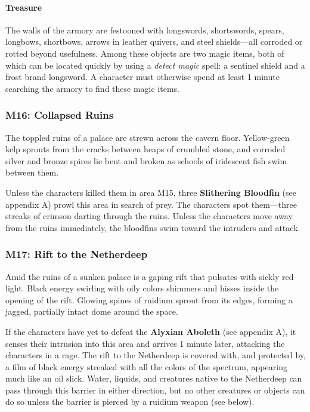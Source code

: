 \documentclass[10pt,a4,twoside,twocolumn,openany,nodeprecatedcode]{dndbook}
\begin{document}
\paragraph{Treasure}
The walls of the armory are festooned with longswords, shortswords, spears, longbows, shortbows, arrows in leather quivers, and steel shields—all corroded or rotted beyond usefulness. Among these objects are two magic items, both of which can be located quickly by using a \textit{detect magic} spell: a sentinel shield and a frost brand longsword. A character must otherwise spend at least 1 minute searching the armory to find these magic items.
\subsubsection{M16: Collapsed Ruins}
\begin{DndReadAloud}{}
The toppled ruins of a palace are strewn across the cavern floor. Yellow-green kelp sprouts from the cracks between heaps of crumbled stone, and corroded silver and bronze spires lie bent and broken as schools of iridescent fish swim between them.
\end{DndReadAloud}

Unless the characters killed them in area M15, three \textbf{Slithering Bloodfin} (see appendix A) prowl this area in search of prey. The characters spot them—three streaks of crimson darting through the ruins. Unless the characters move away from the ruins immediately, the bloodfins swim toward the intruders and attack.
\subsubsection{M17: Rift to the Netherdeep}
\begin{DndReadAloud}{}
Amid the ruins of a sunken palace is a gaping rift that pulsates with sickly red light. Black energy swirling with oily colors shimmers and hisses inside the opening of the rift. Glowing spines of ruidium sprout from its edges, forming a jagged, partially intact dome around the space.
\end{DndReadAloud}

If the characters have yet to defeat the \textbf{Alyxian Aboleth} (see appendix A), it senses their intrusion into this area and arrives 1 minute later, attacking the characters in a rage.
The rift to the Netherdeep is covered with, and protected by, a film of black energy streaked with all the colors of the spectrum, appearing much like an oil slick. Water, liquids, and creatures native to the Netherdeep can pass through this barrier in either direction, but no other creatures or objects can do so unless the barrier is pierced by a ruidium weapon (see below).
\end{document}
